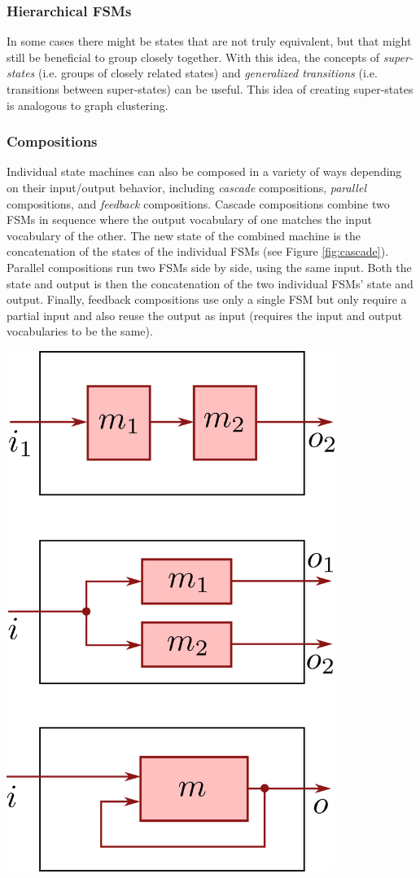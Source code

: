\begin{example}
\subsubsection{Hierarchical FSMs}
In some cases there might be states that are not truly equivalent, but that might still be beneficial to group closely together. With this idea, the concepts of \textit{super-states} (i.e. groups of closely related states) and \textit{generalized transitions} (i.e. transitions between super-states) can be useful. This idea of creating super-states is analogous to graph clustering.

\subsubsection{Compositions}
Individual state machines can also be composed in a variety of ways depending on their input/output behavior, including \textit{cascade} compositions, \textit{parallel} compositions, and \textit{feedback} compositions. Cascade compositions combine two FSMs in sequence where the output vocabulary of one matches the input vocabulary of the other. The new state of the combined machine is the concatenation of the states of the individual FSMs (see Figure \ref{fig:cascade}). Parallel compositions run two FSMs side by side, using the same input. Both the state and output is then the concatenation of the two individual FSMs' state and output. Finally, feedback compositions use only a single FSM but only require a partial input and also reuse the output as input (requires the input and output vocabularies to be the same). \begin{marginfigure}
    \centering
    \includegraphics[width=0.8\textwidth]{tex/figs/ch19_figs/compositions.png}

\end{marginfigure}
\end{example}
